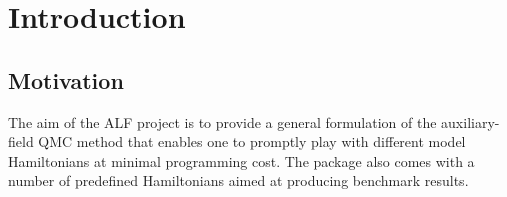 

\section{Introduction}\label{sec:intro}


\subsection{Motivation}

The aim of the ALF project is to provide a general formulation of the auxiliary-field QMC method that enables one to promptly play with different model Hamiltonians at  minimal programming cost. The package also comes with a number of predefined Hamiltonians aimed at producing benchmark results. 

